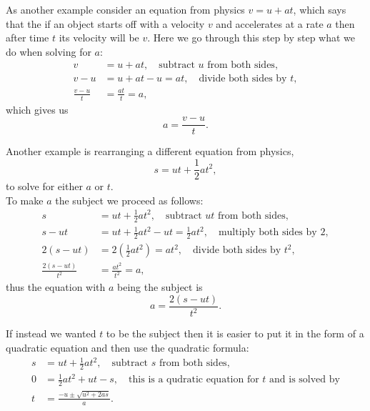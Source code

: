 \begin{ex}
As another example consider an equation from physics $v=u+at$, which says that the if an object starts off with a velocity $v$ and accelerates at a rate $a$ then after time $t$ its velocity will be $v$. Here we go through this step by step what we do when solving for $a$:
\begin{align*}
v&=u+at, \quad \text{subtract $u$ from both sides},\\
v-u&=u+at -u=at, \quad \text{divide both sides by $t$},\\
\frac{v-u}{t}&=\frac{at}{t}=a,
\end{align*}
which gives us
\begin{equation*}
a=\frac{v-u}{t}.
\end{equation*}
\end{ex}

\begin{ex}
Another example is rearranging a different equation from physics,
\begin{equation*}
s=ut+\frac{1}{2}at^{2},
\end{equation*}
to solve for either $a$ or $t$.\\

To make $a$ the subject we proceed as follows:
\begin{align*}
s&=ut+\frac{1}{2}at^{2}, \quad \text{subtract $ut$ from both sides},\\
s-ut&=ut+\frac{1}{2}at^{2}-ut=\frac{1}{2}at^{2}, \quad \text{multiply both sides by $2$},\\
2\left(s-ut\right)&=2\left(\frac{1}{2}at^{2}\right)=at^{2}, \quad \text{divide both sides by $t^{2}$},\\
\frac{2\left(s-ut\right)}{t^{2}}&=\frac{at^{2}}{t^{2}}=a,
\end{align*}
thus the equation with $a$ being the subject is 
\begin{equation*}
a=\frac{2\left(s-ut\right)}{t^{2}}.
\end{equation*}

If instead we wanted $t$ to be the subject then it is easier to put it in the form of a quadratic equation and then use the quadratic formula:
\begin{align*}
s&=ut+\frac{1}{2}at^{2}, \quad \text{subtract $s$ from both sides},\\
0&=\frac{1}{2}at^{2}+ut-s,\quad \text{this is a qudratic equation for $t$ and is solved by}\\
t&=\frac{-u\pm\sqrt{u^{2}+2as}}{a}.
\end{align*}
\end{ex}

